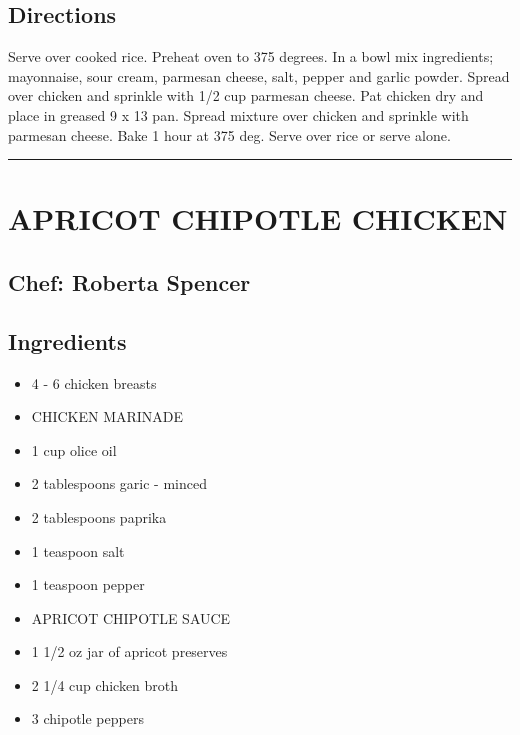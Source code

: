 \documentclass[
]{book}
\providecommand{\tightlist}{%
  \setlength{\itemsep}{0pt}\setlength{\parskip}{0pt}}
\begin{document}
\hypertarget{directions-39}{%
\subsection*{Directions}\label{directions-39}}


Serve over cooked rice. Preheat oven to 375 degrees. In a bowl
mix ingredients; mayonnaise, sour cream, parmesan cheese, salt,
pepper and garlic powder. Spread over chicken and sprinkle with 1/2 cup
parmesan cheese. Pat chicken dry and place in greased 9 x 13 pan.
Spread mixture over chicken and sprinkle with parmesan cheese.
Bake 1 hour at 375 deg. Serve over rice or serve alone.

\begin{center}\rule{0.5\linewidth}{0.5pt}\end{center}

\hypertarget{apricot-chipotle-chicken}{%
\section*{APRICOT CHIPOTLE CHICKEN}\label{apricot-chipotle-chicken}}


\hypertarget{chef-roberta-spencer-13}{%
\subsection*{Chef: Roberta Spencer}\label{chef-roberta-spencer-13}}


\hypertarget{ingredients-40}{%
\subsection*{Ingredients}\label{ingredients-40}}


\begin{itemize}
\tightlist
\item
  4 - 6 chicken breasts
\item
  CHICKEN MARINADE
\item
  1 cup olice oil
\item
  2 tablespoons garic - minced
\item
  2 tablespoons paprika
\item
  1 teaspoon salt
\item
  1 teaspoon pepper
\item
  APRICOT CHIPOTLE SAUCE
\item
  1 1/2 oz jar of apricot preserves
\item
  2 1/4 cup chicken broth
\item
  3 chipotle peppers
\end{itemize}
\end{document}
